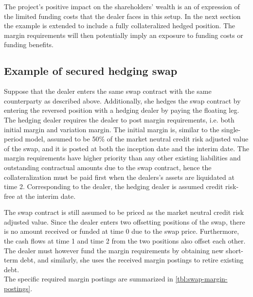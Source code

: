 \documentclass[main.tex]{subfiles}
\begin{document}
            The project's positive impact on the shareholders' wealth is an of expression of the limited funding costs
            that the dealer faces in this setup.
            In the next section the example is extended to include a fully collateralized hedged position.
            The margin requirements will then potentially imply an exposure to funding costs or funding benefits.

        \subsection{Example of secured hedging swap}
            Suppose that the dealer enters the same swap contract with the same counterparty as described above.
            Additionally, she hedges the swap contract by entering the reversed position with a hedging dealer
            by paying the floating leg.
            The hedging dealer requires the dealer to post margin requirements,
            i.e. both initial margin and variation margin.
            The initial margin is,
            similar to the single-period model,
            assumed to be 50\% of the market neutral credit risk adjusted value of the swap,
            and it is posted at both the inception date and the interim date.
            The margin requirements have higher priority than any other existing liabilities and outstanding contractual amounts due to the swap contract,
            hence the collateralization must be paid first when the dealers's assets are liquidated at time 2.
            Corresponding to the dealer, the hedging dealer is assumed credit risk-free at the interim date.

            The swap contract is still assumed to be priced as the market neutral credit risk adjusted value.
            Since the dealer enters two offsetting positions of the swap,
            there is no amount received or funded at time 0 due to the swap price.
            Furthermore, the cash flows at time 1 and time 2 from the two positions also offset each other.
            The dealer must however fund the margin requirements by obtaining new short-term debt,
            and similarly, she uses the received margin postings to retire existing debt.
            \\
            The specific required margin postings are summarized in \cref{tbl:swap-margin-postings}.
\end{document}
